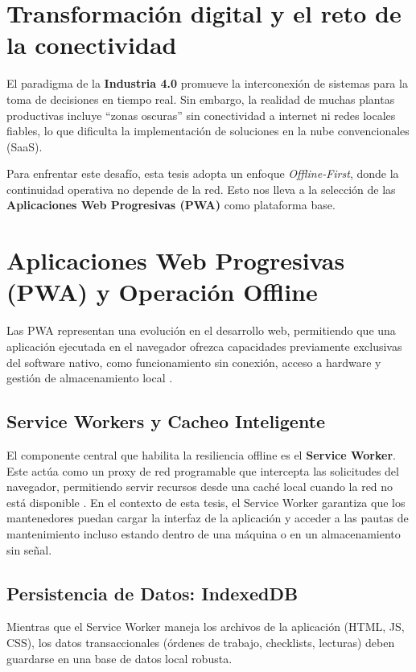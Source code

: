 \documentclass[10pt,a4paper]{report}
\begin{document}
\section*{Transformación digital y el reto de la conectividad}
El paradigma de la \textbf{Industria 4.0} promueve la interconexión de sistemas para la toma de decisiones en tiempo real. Sin embargo, la realidad de muchas plantas productivas incluye ``zonas oscuras'' sin conectividad a internet ni redes locales fiables, lo que dificulta la implementación de soluciones en la nube convencionales (SaaS).

Para enfrentar este desafío, esta tesis adopta un enfoque \textit{Offline-First}, donde la continuidad operativa no depende de la red. Esto nos lleva a la selección de las \textbf{Aplicaciones Web Progresivas (PWA)} como plataforma base.

\section*{Aplicaciones Web Progresivas (PWA) y Operación Offline}
Las PWA representan una evolución en el desarrollo web, permitiendo que una aplicación ejecutada en el navegador ofrezca capacidades previamente exclusivas del software nativo, como funcionamiento sin conexión, acceso a hardware y gestión de almacenamiento local \cite{MDN_PWA}.

\subsection*{Service Workers y Cacheo Inteligente}
El componente central que habilita la resiliencia offline es el \textbf{Service Worker}. Este actúa como un proxy de red programable que intercepta las solicitudes del navegador, permitiendo servir recursos desde una caché local cuando la red no está disponible \cite{ServiceWorkers_W3C}. En el contexto de esta tesis, el Service Worker garantiza que los mantenedores puedan cargar la interfaz de la aplicación y acceder a las pautas de mantenimiento incluso estando dentro de una máquina o en un almacenamiento sin señal.

\subsection*{Persistencia de Datos: IndexedDB}
Mientras que el Service Worker maneja los archivos de la aplicación (HTML, JS, CSS), los datos transaccionales (órdenes de trabajo, checklists, lecturas) deben guardarse en una base de datos local robusta.
\end{document}

